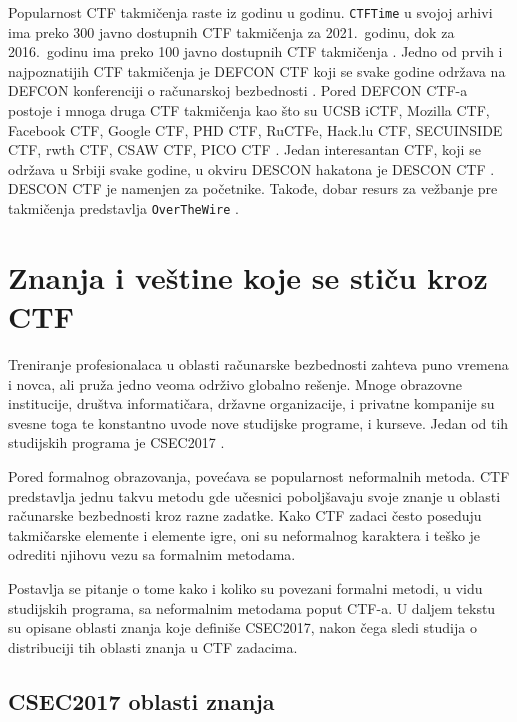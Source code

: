 \documentclass[12pt, a4paper, twocolumn]{article}
\begin{document}
Popularnost CTF takmičenja raste iz godinu u godinu. \texttt{CTFTime} u
svojoj arhivi ima preko 300 javno dostupnih CTF takmičenja za 2021.\ godinu,
dok za 2016.\ godinu ima preko 100 javno dostupnih CTF takmičenja
\cite{ctf_time}. Jedno od prvih i najpoznatijih CTF takmičenja je DEFCON CTF
koji se svake godine održava na DEFCON konferenciji o računarskoj bezbednosti 
\cite{ctf_defcon}. Pored DEFCON CTF-a postoje i mnoga druga CTF takmičenja kao 
što su UCSB iCTF, Mozilla CTF, Facebook CTF, Google CTF, PHD CTF, RuCTFe, 
Hack.lu CTF, SECUINSIDE CTF, rwth CTF, CSAW CTF, PICO CTF \cite{ctf_rank}.
Jedan interesantan CTF, koji se održava u Srbiji svake godine, u okviru 
DESCON hakatona je DESCON CTF \cite{ctf_descon}. DESCON CTF je namenjen 
za početnike. Takođe, dobar resurs za vežbanje pre takmičenja predstavlja
\texttt{OverTheWire} \cite{ctf_otw}.

\section{Znanja i veštine koje se stiču kroz CTF}

Treniranje profesionalaca u oblasti računarske bezbednosti zahteva puno 
vremena i novca, ali pruža jedno veoma održivo globalno rešenje. Mnoge 
obrazovne institucije, društva informatičara, državne organizacije, i privatne
kompanije su svesne toga te konstantno uvode nove studijske programe, 
i kurseve. Jedan od tih studijskih programa je CSEC2017 \cite{ctf_csec}.

Pored formalnog obrazovanja, povećava se popularnost neformalnih metoda.
CTF predstavlja jednu takvu metodu gde učesnici poboljšavaju svoje znanje u
oblasti računarske bezbednosti kroz razne zadatke. Kako CTF zadaci često 
poseduju takmičarske elemente i elemente igre, oni su neformalnog karaktera
i teško je odrediti njihovu vezu sa formalnim metodama.

Postavlja se pitanje o tome kako i koliko su povezani formalni metodi,
u vidu studijskih programa, sa neformalnim metodama poput CTF-a. U daljem 
tekstu su opisane oblasti znanja koje definiše CSEC2017, nakon čega sledi 
studija o distribuciji tih oblasti znanja u CTF zadacima.

\subsection{CSEC2017 oblasti znanja}
\end{document}

